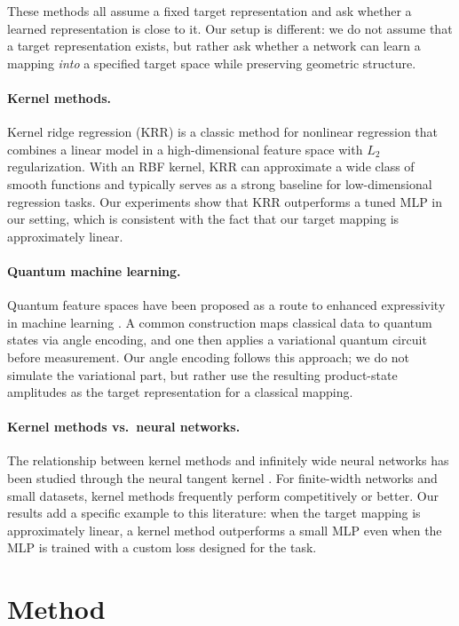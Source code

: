 \documentclass[11pt]{article}
\begin{document}
These methods all assume a fixed target representation and ask whether a
learned representation is close to it. Our setup is different: we do not
assume that a target representation exists, but rather ask whether a
network can learn a mapping \emph{into} a specified target space while
preserving geometric structure.

\paragraph{Kernel methods.} Kernel ridge regression (KRR)
\cite{saunders1998ridge} is a classic method for nonlinear regression that
combines a linear model in a high-dimensional feature space with $L_{2}$
regularization. With an RBF kernel, KRR can approximate a wide class of
smooth functions and typically serves as a strong baseline for
low-dimensional regression tasks. Our experiments show that KRR outperforms
a tuned MLP in our setting, which is consistent with the fact that our
target mapping is approximately linear.

\paragraph{Quantum machine learning.} Quantum feature spaces have been
proposed as a route to enhanced expressivity in machine learning
\cite{havlicek2019supervised, schuld2021machine}. A common construction maps
classical data to quantum states via angle encoding, and one then applies a
variational quantum circuit before measurement. Our angle encoding follows
this approach; we do not simulate the variational part, but rather use the
resulting product-state amplitudes as the target representation for a
classical mapping.

\paragraph{Kernel methods vs.\ neural networks.} The relationship between
kernel methods and infinitely wide neural networks has been studied through
the neural tangent kernel \cite{jacot2018neural}. For finite-width networks
and small datasets, kernel methods frequently perform competitively or
better. Our results add a specific example to this literature: when the
target mapping is approximately linear, a kernel method outperforms a small
MLP even when the MLP is trained with a custom loss designed for the task.

\section{Method}
\label{sec:method}
\end{document}
